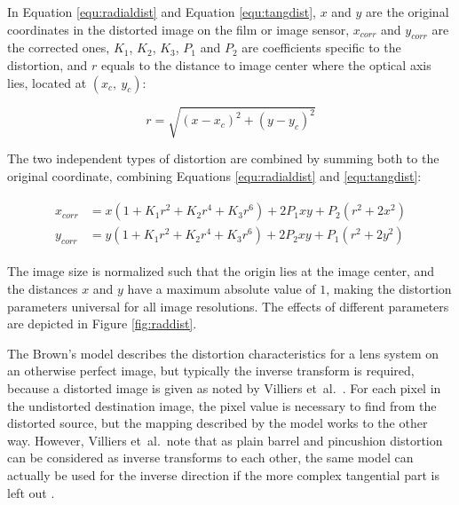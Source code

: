 In Equation \ref{equ:radialdist} and Equation \ref{equ:tangdist}, $x$ and $y$ are the original coordinates in the distorted image on the film or image sensor, $x_{corr}$ and $y_{corr}$ are the corrected ones, $K_1$, $K_2$, $K_3$, $P_1$ and $P_2$ are coefficients specific to the distortion, and $r$ equals to the distance to image center where the optical axis lies, located at $(x_c,~y_c)$:

\begin{equation}
r = \sqrt{(x - x_c)^2 + (y - y_c)^2}
\end{equation}

The two independent types of distortion are combined by summing both to the original coordinate, combining Equations \ref{equ:radialdist} and \ref{equ:tangdist}:

\begin{align} \label{equ:bothdist} \begin{split}
	x_{corr} &= x (1 + K_1 r^2 + K_2 r^4 + K_3 r^6) + 2 P_1 x y + P_2 (r^2 + 2 x^2)\\
	y_{corr} &= y (1 + K_1 r^2 + K_2 r^4 + K_3 r^6) + 2 P_2 x y + P_1 (r^2 + 2 y^2)
\end{split} \end{align}

The image size is normalized such that the origin lies at the image center, and the distances $x$ and $y$ have a maximum absolute value of $1$, making the distortion parameters universal for all image resolutions.
The effects of different parameters are depicted in Figure \ref{fig:raddist}.


The Brown's model describes the distortion characteristics for a lens system on an otherwise perfect image, but typically the inverse transform is required, because a distorted image is given as noted by Villiers et~al.\ \cite{villiers2008centi}. %
For each pixel in the undistorted destination image, the pixel value is necessary to find from the distorted source, but the mapping described by the model works to the other way.
However, Villiers et~al.\ note that as plain barrel and pincushion distortion can be considered as inverse transforms to each other, the same model can actually be used for the inverse direction if the more complex tangential part is left out \cite{villiers2008centi}.

